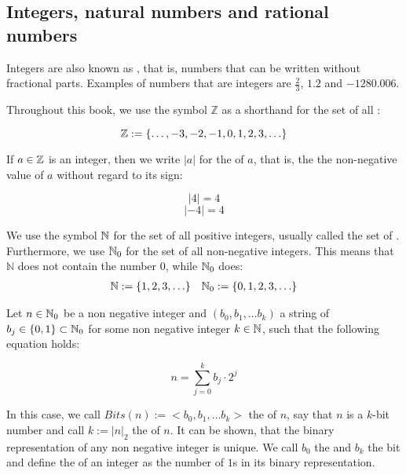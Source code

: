 \subsection{Integers, natural numbers and rational numbers}

Integers are also known as , that is, numbers that can be written without fractional parts. Examples of numbers that are  integers are $\frac{2}{3}$, $1.2$ and $-1280.006$.

Throughout this book, we use the symbol $\mathbb{Z}$ as a shorthand for the set of all :

\begin{equation}
\label{integer_symbol}
\mathbb{Z} := \{\ldots, -3,-2,-1,0,1,2,3,\ldots\}
\end{equation}

If $a\in \mathbb{Z}$ is an integer, then we write $|a|$ for the  of $a$, that is, the the non-negative value of $a$ without regard to its sign:

\begin{equation}
|4|= 4
\end{equation}
\begin{equation}
|-4|= 4
\end{equation}

We use the symbol $\mathbb{N}$ for the set of all positive integers, usually called the set of . Furthermore, we use $\mathbb{N}_0$ for the set of all non-negative integers. This means that $\mathbb{N}$ does not contain the number $0$, while $\mathbb{N}_0$ does:
\begin{align*}
\label{natural_symbol}
\mathbb{N} := \{1,2,3,\ldots\} & & \mathbb{N}_0 := \{0,1,2,3,\ldots\}
\end{align*}

Let $n\in\mathbb{N}_0$ be a non negative integer and $(b_0,b_1,\ldots b_k)$ a string of  $b_j\in\{0,1\}\subset\mathbb{N}_0$ for some non negative integer $k\in\mathbb{N}$, such that the following equation holds:

\begin{equation}
\label{def:binary_representation_integer}
n = \sum_{j=0}^k b_j\cdot 2^j
\end{equation}

In this case, we call $Bits(n):= <b_0,b_1,\ldots b_k>$ the  of $n$, say that $n$ is a $k$-bit number and call $k:= |n|_2$ the  of $n$. It can be shown, that the binary representation of any non negative integer is unique. We call $b_0$ the  and $b_k$ the  bit and define the  of an integer as the number of $1$s in its binary representation.

